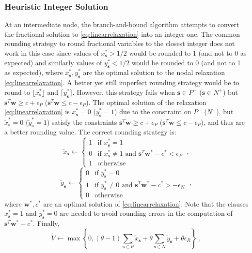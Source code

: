 \documentclass[11pt]{article}
\theoremstyle{definition}
\newcommand{\vect}[1]{\mathbf{#1}}
\newcommand{\sv}[1]{_{\vect{#1}}}
\begin{document}
\subsubsection{Heuristic Integer Solution}
\label{sec:iheur}
At an intermediate node, the branch-and-bound algorithm attempts to 
convert the fractional solution to \eqref{eq:linearrelaxation} into
an integer one. The common rounding strategy to round fractional 
variables to the closest integer does not work in this case since
values of $x\sv{s}^* > 1/2$ would be rounded to 1 (and not to 0 as expected)
and similarly 
values of $y\sv{s}^* < 1/2$ would be rounded to 0 (and not to 1 as expected),
where $x\sv{s}^*, y\sv{s}^*$ are the optimal solution to the nodal relaxation
\eqref{eq:linearrelaxation}.
A better yet still imperfect rounding strategy would be to 
round to $\lfloor x\sv{s}^* \rfloor$ and $\lceil y\sv{s}^* \rceil$.
However, this strategy fails when $\vect{s} \in P^-$ ($\vect{s} \in N^+$)
but $\vect{s}^T \vect{w} \geq c + \epsilon_P$ 
($\vect{s}^T \vect{w} \leq c - \epsilon_P$).
The optimal solution of the relaxation \eqref{eq:linearrelaxation}
is $x\sv{s}^* = 0$ ($y\sv{s}^* = 1$) due to the constraint on $P^-$ ($N^+$), 
but $\tilde{x}\sv{s}^* = 0$ ($\tilde{y}\sv{s}^* = 1$) satisfy
the constraints $\vect{s}^T \vect{w} \geq c + \epsilon_P$ 
($\vect{s}^T \vect{w} \leq c - \epsilon_P$),
and thus are a better rounding value.
The correct rounding strategy is:
$$\tilde{x}\sv{s} \leftarrow \begin{cases}
1 & \text{if } x\sv{s}^* = 1 \\
0 & \text{if } x\sv{s}^* \neq 1 \text{ and } \vect{s}^T \vect{w}^* - c^* < \epsilon_P \\
1 & \text{otherwise}
\end{cases}\;,$$
$$\tilde{y}\sv{s} \leftarrow \begin{cases}
0 & \text{if } y\sv{s}^* = 0 \\
1 & 
\text{if } y\sv{s}^* \neq 0 \text{ and } \vect{s}^T \vect{w}^* - c^* > - \epsilon_N \\
0 & \text{otherwise}
\end{cases}\;,$$
where $\vect{w}^*, c^*$ are an optimal solution of \eqref{eq:linearrelaxation}.
Note that the clauses $x\sv{s}^* = 1$ and $y\sv{s}^* = 0$ are needed
to avoid rounding errors in the computation of 
$\vect{s}^T \vect{w}^* - c^*$.
Finally,
$$\tilde{V} \leftarrow \max \left\{ 0,
(\theta  - 1) \sum_{\vect{s} \in P} \tilde{x}\sv{s} + 
\theta \sum_{\vect{s} \in N} \tilde{y}\sv{s} + 
\theta \epsilon_R \right\}\;,$$
\end{document}

